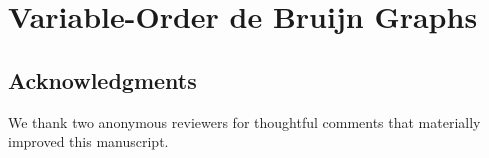 \def\vardir{chapters/variable-order-dbg_sections}

\chapter{Variable-Order de Bruijn Graphs}

\begin{quote}

\end{quote}








\section*{Acknowledgments}
We thank two anonymous reviewers for thoughtful comments that materially improved this manuscript.


%
%

%


